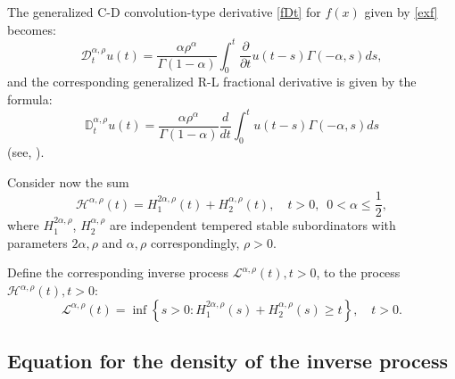 \documentclass[12pt]{article}
\theoremstyle{definition}
\theoremstyle{plain}
\begin{document}
    The generalized C-D convolution-type derivative \eqref{fDt} for $f(x)$ given by \eqref{exf} becomes:
    \begin{equation}\label{exfDt}
    {\mathcal D}^{\alpha,\rho}_t u(t)= \frac{\alpha \rho^{\alpha}}{\Gamma(1-\alpha)}\int_{0}^{t}\frac{\partial }{\partial t }u(t-s)\Gamma(-\alpha,s)ds,
    \end{equation}
and the corresponding generalized  R-L fractional derivative is given by the formula:
\begin{equation}\label{exfDDt}
\mathbb{D}^{\alpha,\rho}_t u(t)=\frac{\alpha \rho^{\alpha}}{\Gamma(1-\alpha)}\frac{d}{dt}\int_{0}^{t}u(t-s)\Gamma(-\alpha,s)ds
\end{equation}
(see, \cite{T}).

Consider now the sum
	\begin{equation}\label{temp2.1}
		\mathcal{H}^{\alpha,\rho}(t) = H_1^{2\alpha, \rho}(t) +  H_2^{\alpha,\rho}(t), \quad t > 0,\,\,\, 0 < \alpha \le \frac{1}{2},
	\end{equation}
	where  $H_1^{2\alpha, \rho}$, $H_2^{\alpha,\rho}$  are independent tempered stable subordinators with parameters ${2\alpha, \rho}$ and $\alpha, \rho$ correspondingly, $\rho > 0$. 
	
	Define the corresponding inverse process  $\mathcal{L}^{\alpha,\rho}(t), t > 0$, to the process $\mathcal{H}^{\alpha,\rho}(t), t > 0$:
	\begin{equation}\label{temp1.13}
		\mathcal{L}^{\alpha,\rho}(t) = \inf \left\{ s > 0 : H_1^{2\alpha,\rho}(s) +  H_2^{\alpha,\rho}(s) \ge t \right\}, \quad t > 0.
	\end{equation}
	
\subsection{Equation for the density of the inverse process}
\end{document}
